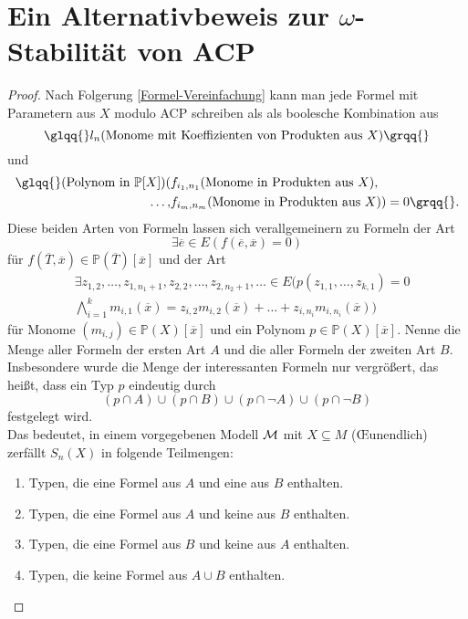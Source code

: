 \renewcommand\thesection{\Alph{section}}
\section{Ein Alternativbeweis zur $\omega$-Stabilität von ACP}

\begin{proof}
	Nach Folgerung \ref{Formel-Vereinfachung} kann man jede Formel mit Parametern aus $X$ modulo ACP schreiben als als boolesche Kombination aus $$\glqq{}l_n(\text{Monome mit Koeffizienten von Produkten aus }X)\grqq{}$$ und
	\begin{align*}
	\text{\glqq{}}(\text{Polynom in }\mathbb{P}[X])(&f_{i_1,n_1}(\text{Monome in Produkten aus }X),\\\dots,&f_{i_m,n_m}(\text{Monome in Produkten aus }X))=0\grqq{}.
	\end{align*}
	Diese beiden Arten von Formeln lassen sich verallgemeinern
    zu Formeln der Art $${\exists\overline{e}\in E(f(\overline{e},\overline{x})=0)}$$ für  $f(\overline{T},\overline{x})\in\mathbb{P}(\overline{T})[\overline{x}]$ und der Art
	\begin{align*}
	&\exists z_{1,2},\dots,z_{1,n_1+1},z_{2,2},\dots,z_{2,n_2+1},\dots\in E(p(z_{1,1},\dots,z_{k,1})=0\\
	&\bigwedge\limits_{i=1}^km_{i,1}(\overline{x})=z_{i,2}m_{i,2}(\overline{x})+\dots+z_{i,n_i}m_{i,n_i}(\overline{x}))
	\end{align*}
	für Monome $(m_{i,j})\in\mathbb{P}(X)[\overline{x}]$ und ein Polynom $p\in\mathbb{P}(X)[\overline{x}]$. Nenne die Menge aller Formeln der ersten Art $A$ und die aller Formeln der zweiten Art $B$. Insbesondere wurde die Menge der \glqq{}interessanten\grqq{} Formeln nur vergrößert, das heißt, dass ein Typ $p$ eindeutig durch $$(p\cap A)\cup(p\cap B)\cup(p\cap\neg A)\cup(p\cap\neg B)$$ festgelegt wird.\\
	Das bedeutet, in einem vorgegebenen Modell $\mathcal{M}$ mit $X\subseteq M$ (\OE unendlich) zerfällt $S_n(X)$ in folgende Teilmengen:\\
	\begin{enumerate}
		\item Typen, die eine Formel aus $A$ und eine aus $B$ enthalten.
		\item Typen, die eine Formel aus $A$ und keine aus $B$ enthalten.
		\item Typen, die eine Formel aus $B$ und keine aus $A$ enthalten.
		\item Typen, die keine Formel aus $A\cup B$ enthalten.

\end{enumerate}
\end{proof}
